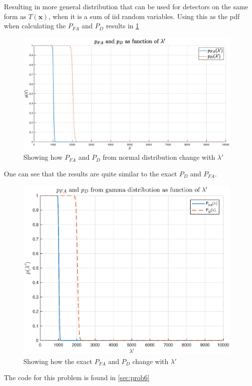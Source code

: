 Resulting in more general distribution that can be used for detectors on the same form as $T(\mathbf{x})$, when it is a sum of iid random variables. Using this as the pdf when calculating the $P_{FA}$ and $P_D$ results in \ref{fig:pfavspdaslambda}
\begin{figure}
    \centering
    \includegraphics[width=\textwidth]{figures/gauss_lambda_pfa_pd.eps}
    \caption{Showing how $P_{FA}$ and $P_D$ from normal distribution change with $\lambda'$}
    \label{fig:pfavspdaslambda}
\end{figure}
One can see that the results are quite similar to the exact $P_{D}$ and $P_{FA}$.
\begin{figure}
    \centering
    \includegraphics[width=\textwidth]{figures/pfapd3.eps}
    \caption{Showing how the exact $P_{FA}$ and $P_D$ change with $\lambda'$}
    \label{fig:exactpdpfa}
\end{figure}
The code for this problem is found in \ref{sec:prob6}
\newpage

